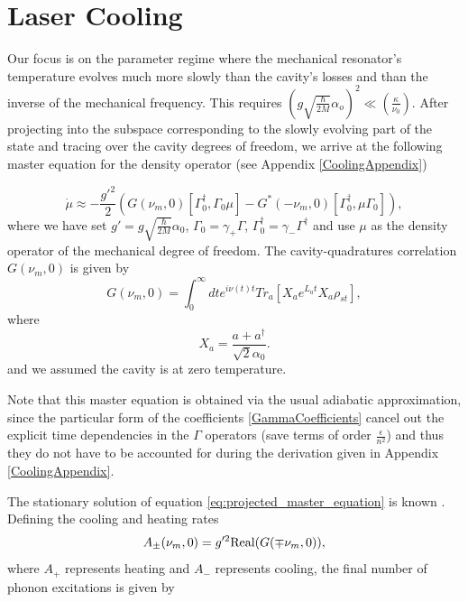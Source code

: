 \documentclass[reprint, amsmath,amssymb, aps,pra]{revtex4-1}
\begin{document}
\section{Laser Cooling}\label{LasCool}

Our focus is on the parameter regime where the mechanical resonator's
temperature evolves much more slowly than the cavity's losses and than
the inverse of the mechanical frequency. This requires
$(g\sqrt{\frac{\hbar}{2M}}\alpha_o)^2 \ll (\frac{\kappa}{\nu_0})$.
After projecting into the subspace corresponding to the slowly
evolving part of the state and tracing over the cavity degrees of
freedom, we arrive at the following master equation for the density
operator (see Appendix \ref{CoolingAppendix})

\begin{equation}\label{eq:projected_master_equation}
  \dot{\mu}\approx -\frac{g'^2}{2}(G(\nu_m,0)[\Gamma^\dagger_0,\Gamma_0\mu]-G^*(-\nu_m,0)[\Gamma_0^\dagger,\mu\Gamma_0]),
\end{equation}
where we have set $g'=g\sqrt{\frac{\hbar}{2M}}\alpha_0$,
$\Gamma_0=\gamma_+\Gamma$, $\Gamma_0^\dagger=\gamma_-\Gamma^\dagger$
and use $\mu$ as the density operator of the mechanical degree of
freedom. The cavity-quadratures correlation $G(\nu_m,0)$ is given by
\begin{equation} \label{CavityQuadrature}
G(\nu_m,0) = \int_0^\infty dt e^{i\nu(t) t}Tr_a[X_a e^{L_a t} X_a \rho_{st}],
\end{equation}
where 
\begin{equation}
X_a = \frac{a + a^\dagger}{\sqrt{2}\alpha_0}.
\end{equation}
and we assumed the cavity is at zero temperature.

Note that this master equation is obtained via the usual adiabatic
approximation, since the particular form of the coefficients
\eqref{GammaCoefficients} cancel out the explicit time dependencies in
the $\Gamma$ operators (save terms of order $\frac{\epsilon}{n^2}$)
and thus they do not have to be accounted for during the derivation
given in Appendix \ref{CoolingAppendix}.

The stationary solution of equation
\eqref{eq:projected_master_equation} is known .
Defining the cooling and heating rates
\begin{equation}
A_\pm(\nu_m,0) = g'^2{\rm Real}(G(\mp \nu_m,0)),
\end{equation}
where $A_+$ represents heating and $A_-$ represents cooling, the final
number of phonon excitations is given by
\end{document}
